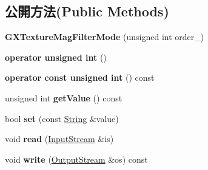 \subsection*{公開方法(Public Methods)}
\begin{DoxyCompactItemize}
\item 
{\bfseries G\+X\+Texture\+Mag\+Filter\+Mode} (unsigned int order\+\_)\hypertarget{class_i_dream_sky_1_1_g_x_texture_mag_filter_mode_a25371a37817f538a1c814007bb1a67e1}{}\label{class_i_dream_sky_1_1_g_x_texture_mag_filter_mode_a25371a37817f538a1c814007bb1a67e1}

\item 
{\bfseries operator unsigned int} ()\hypertarget{class_i_dream_sky_1_1_g_x_texture_mag_filter_mode_a6b5e16a40982a03883c0672c32bbd5f3}{}\label{class_i_dream_sky_1_1_g_x_texture_mag_filter_mode_a6b5e16a40982a03883c0672c32bbd5f3}

\item 
{\bfseries operator const unsigned int} () const \hypertarget{class_i_dream_sky_1_1_g_x_texture_mag_filter_mode_af366751f6199f8782c09c692dec3f374}{}\label{class_i_dream_sky_1_1_g_x_texture_mag_filter_mode_af366751f6199f8782c09c692dec3f374}

\item 
unsigned int {\bfseries get\+Value} () const \hypertarget{class_i_dream_sky_1_1_g_x_texture_mag_filter_mode_a79b80c20b98fb2f92e40eb2b1f976afc}{}\label{class_i_dream_sky_1_1_g_x_texture_mag_filter_mode_a79b80c20b98fb2f92e40eb2b1f976afc}

\item 
bool {\bfseries set} (const \hyperlink{class_i_dream_sky_1_1_string}{String} \&value)\hypertarget{class_i_dream_sky_1_1_g_x_texture_mag_filter_mode_a74ff73a77fe8e1bb6a9c20884800c224}{}\label{class_i_dream_sky_1_1_g_x_texture_mag_filter_mode_a74ff73a77fe8e1bb6a9c20884800c224}

\item 
void {\bfseries read} (\hyperlink{class_i_dream_sky_1_1_input_stream}{Input\+Stream} \&is)\hypertarget{class_i_dream_sky_1_1_g_x_texture_mag_filter_mode_a0e03838cc16f927ca4e7393e2a9ef6a8}{}\label{class_i_dream_sky_1_1_g_x_texture_mag_filter_mode_a0e03838cc16f927ca4e7393e2a9ef6a8}

\item 
void {\bfseries write} (\hyperlink{class_i_dream_sky_1_1_output_stream}{Output\+Stream} \&os) const \hypertarget{class_i_dream_sky_1_1_g_x_texture_mag_filter_mode_af6d9f47fc8ce21e86cae6679689b926d}{}\label{class_i_dream_sky_1_1_g_x_texture_mag_filter_mode_af6d9f47fc8ce21e86cae6679689b926d}

\end{DoxyCompactItemize}


